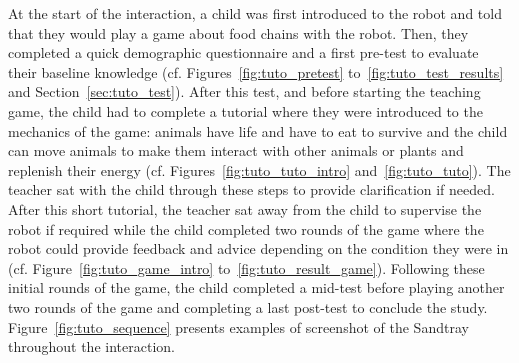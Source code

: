 At the start of the interaction, a child was first introduced to the robot and told that they would play a game about food chains with the robot. Then, they completed a quick demographic questionnaire and a first pre-test to evaluate their baseline knowledge (cf. Figures~\ref{fig:tuto_pretest} to~\ref{fig:tuto_test_results} and Section~\ref{sec:tuto_test}). After this test, and before starting the teaching game, the child had to complete a tutorial where they were introduced to the mechanics of the game: animals have life and have to eat to survive and the child can move animals to make them interact with other animals or plants and replenish their energy (cf. Figures~\ref{fig:tuto_tuto_intro} and~\ref{fig:tuto_tuto}). The teacher sat with the child through these steps to provide clarification if needed. After this short tutorial, the teacher sat away from the child to supervise the robot if required while the child completed two rounds of the game where the robot could provide feedback and advice depending on the condition they were in (cf. Figure~\ref{fig:tuto_game_intro} to~\ref{fig:tuto_result_game}). Following these initial rounds of the game, the child completed a mid-test before playing another two rounds of the game and completing a last post-test to conclude the study. Figure~\ref{fig:tuto_sequence} presents examples of screenshot of the Sandtray throughout the interaction.


